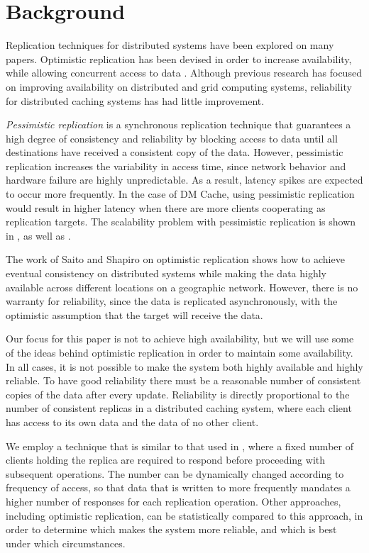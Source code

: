 \section{Background}

Replication techniques for distributed systems have been
explored on many papers. Optimistic replication has been devised
in order to increase availability, while allowing
concurrent access to data \cite{Replication}. Although
previous research has focused on improving availability on
distributed \cite{globally-distributed} and grid computing
systems\cite{Online-Grid}, reliability for distributed caching
systems has had little improvement.

\textit{Pessimistic replication} is a synchronous replication
technique that guarantees a high degree of consistency and
reliability by blocking access to data until all destinations
have received a consistent copy of the data. However, pessimistic
replication increases the variability in access time, since
network behavior and hardware failure are highly unpredictable.
As a result, latency spikes are expected to occur more frequently.
In the case of DM Cache, using pessimistic replication would
result in higher latency when there are more clients cooperating
as replication targets. The scalability problem with pessimistic
replication is shown in \cite{Replicated-Services}, as well as
\cite{Replication-Cost}.

The work of Saito and Shapiro on 
optimistic replication \cite{Replication} shows how to achieve
eventual consistency on distributed systems while making the
data highly available across different locations on a geographic
network. However, there is no warranty for reliability, since the
data is replicated asynchronously, with the optimistic
assumption that the target will receive the data.

Our focus for this paper is not to achieve high
availability, but we will use some of the ideas behind optimistic
replication in order to maintain some availability. In all cases,
it is not possible to make the system both highly available and
highly reliable. To have good reliability there must be a reasonable
number of consistent copies of the data after every update.
Reliability is directly proportional to the number of consistent
replicas in a distributed caching system, where each client has
access to its own data and the data of no other client.

We employ a technique that is similar to
that used in \cite{dynamo}, where a fixed number of clients
holding the replica are required to respond before proceeding with
subsequent operations. The number can be dynamically changed
according to frequency of access, so that data that is written to
more frequently mandates a higher number of responses for each
replication operation. Other approaches, including optimistic
replication, can be statistically compared to this approach, in
order to determine which makes the system more reliable, and which
is best under which circumstances.

